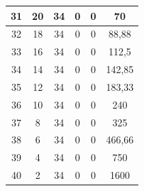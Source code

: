 \begin{table}[]
\begin{tabular}{|c|c|c|c|c|c|}
 			31                                           & 20                     & 34                    & 0                     & 0                      & 70                                                 \\ \hline
 			32                                           & 18                     & 34                    & 0                     & 0                      & 88,88                                       \\ \hline
 			33                                           & 16                     & 34                    & 0                     & 0                      & 112,5                                              \\ \hline
 			34                                           & 14                     & 34                    & 0                     & 0                      & 142,85                                      \\ \hline
 			35                                           & 12                     & 34                    & 0                     & 0                      & 183,33                                       \\ \hline
 			36                                           & 10                     & 34                    & 0                     & 0                      & 240                                                \\ \hline
 			37                                           & 8                      & 34                    & 0                     & 0                      & 325                                                \\ \hline
 			38                                           & 6                      & 34                    & 0                     & 0                      & 466,66                                        \\ \hline
 			39                                           & 4                      & 34                    & 0                     & 0                      & 750                                                \\ \hline
 			40                                           & 2                      & 34                    & 0                     & 0                      & 1600                                               \\ \hline
 		\end{tabular}
 	\end{table}
